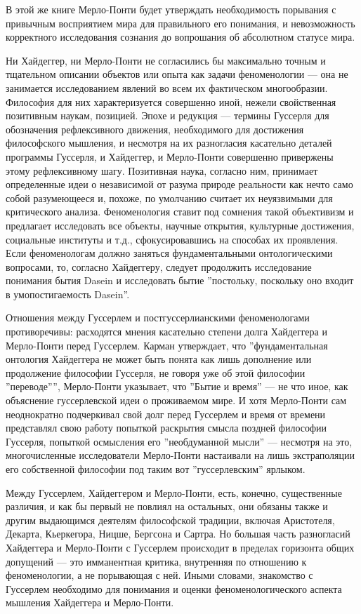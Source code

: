 \documentclass[11pt]{book}
\begin{document}
\relax
{}\relax
\smallskip

В этой же книге Мерло-Понти будет утверждать необходимость порывания с привычным восприятием мира для правильного его понимания, и невозможность корректного исследования сознания до вопрошания об абсолютном статусе мира.

Ни Хайдеггер, ни Мерло-Понти не согласились бы максимально точным и тщательном описании объектов или опыта как задачи феноменологии --- она не занимается исследованием явлений во всем их фактическом многообразии. Философия для них характеризуется совершенно иной, нежели свойственная позитивным наукам, позицией. Эпохе и редукция --- термины Гуссерля для обозначения рефлексивного движения, необходимого для достижения философского мышления, и несмотря на их разногласия касательно деталей программы Гуссерля, и Хайдеггер, и Мерло-Понти совершенно привержены этому рефлексивному шагу. Позитивная наука, согласно ним, принимает определенные идеи о независимой от разума природе реальности как нечто само собой разумеющееся и, похоже, по умолчанию считает их неуязвимыми для критического анализа. Феноменология ставит под сомнения такой объективизм и предлагает исследовать все объекты, научные открытия, культурные достижения, социальные институты и т.д., сфокусировавшись на способах их проявления. Если феноменологам должно заняться фундаментальными онтологическими вопросами, то, согласно Хайдеггеру, следует продолжить исследование понимания бытия Dasein и исследовать бытие ''постольку, поскольку оно входит в умопостигаемость Dasein''.

Отношения между Гуссерлем и постгуссерлианскими феноменологами противоречивы: расходятся мнения касательно степени долга Хайдеггера и Мерло-Понти перед Гуссерлем. Карман утверждает, что ''фундаментальная онтология Хайдеггера не может быть понята как лишь дополнение или продолжение философии Гуссерля, не говоря уже об этой философии ''переводе'''', Мерло-Понти указывает, что ''Бытие и время'' --- не что иное, как объяснение гуссерлевской идеи о проживаемом мире. И хотя Мерло-Понти сам неоднократно подчеркивал свой долг перед Гуссерлем и время от времени представлял свою работу попыткой раскрытия смысла поздней философии Гуссерля, попыткой осмысления его ''необдуманной мысли'' --- несмотря на это, многочисленные исследователи Мерло-Понти настаивали на лишь экстраполяции его собственной философии под таким вот ''гуссерлевским'' ярлыком.

Между Гуссерлем, Хайдеггером и Мерло-Понти, есть, конечно, существенные различия, и как бы первый не повлиял на остальных, они обязаны также и другим выдающимся деятелям философской традиции, включая Аристотеля, Декарта, Кьеркегора, Ницше, Бергсона и Сартра. Но большая часть разногласий Хайдеггера и Мерло-Понти с Гуссерлем происходит в пределах горизонта общих допущений --- это имманентная критика, внутренняя по отношению к феноменологии, а не порывающая с ней. Иными словами, знакомство с Гуссерлем необходимо для понимания и оценки феноменологического аспекта мышления Хайдеггера и Мерло-Понти.
\end{document}
